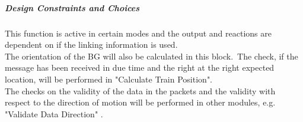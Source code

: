 \documentclass{template/openetcs_report}
\begin{document}
\subparagraph{Design Constraints and Choices}

This function is active in certain modes and the output and reactions are dependent on if the linking information is used.\\
The orientation of the BG will also be calculated in this block.\
The check, if the message has been received in due time and the right at the right expected location, will be performed in "Calculate Train Position".\\
The checks on the validity of the data in the packets and the validity with respect to the direction of motion will be performed in other modules, e.g. "Validate Data Direction" .

\end{document}
